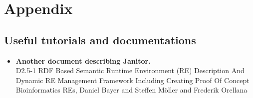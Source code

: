 \chapter{Appendix}

\section{Useful tutorials and documentations}

\begin{itemize}
 \item \textbf{Another document describing Janitor.}\\
    D2.5-1 RDF Based Semantic Runtime Environment (RE) Description And Dynamic RE Management Framework Including Creating Proof Of Concept Bioinformatics REs, Daniel Bayer and Steffen M\"oller and Frederik Orellana\cite{BAYER_2007}


\end{itemize}


 
